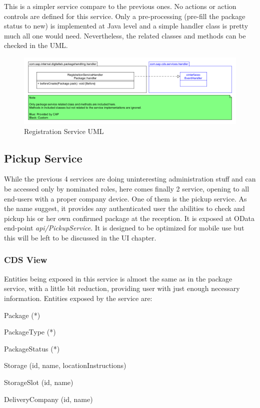 This is a simpler service compare to the previous ones. No actions or action controls are defined for this service. Only a pre-processing (pre-fill the package status to new) is implemented at Java level and a simple handler class is pretty much all one would need. Nevertheless, the related classes and methods can be checked in the UML. 

\begin{figure}[!h]
    \centering
    \includegraphics[width=1\linewidth]{images/service_class_diagrams/registration_service_class_diagram.png}
    \caption{Registration Service UML}
    \label{fig:registration_service_uml}
\end{figure}
\pagebreak




\subsection{Pickup Service}

While the previous 4 services are doing uninteresting administration stuff and can be accessed only by nominated roles, here comes finally 2 service, opening to all end-users with a proper company device. One of them is the pickup service. As the name suggest, it provides any authenticated user the abilities to check and pickup his or her own confirmed package at the reception. It is exposed at OData end-point \textit{api/PickupService}. It is designed to be optimized for mobile use but this will be left to be discussed in the UI chapter.

\subsubsection{CDS View}

Entities being exposed in this service is almost the same as in the package service, with a little bit reduction, providing user with just enough necessary information. Entities exposed by the service are:
\begin{compactenum}
	\item Package (*)
    \item PackageType (*)
    \item PackageStatus (*)
    \item Storage (id, name, locationInstructions)
    \item StorageSlot (id, name)
    \item DeliveryCompany (id, name)
\end{compactenum}

